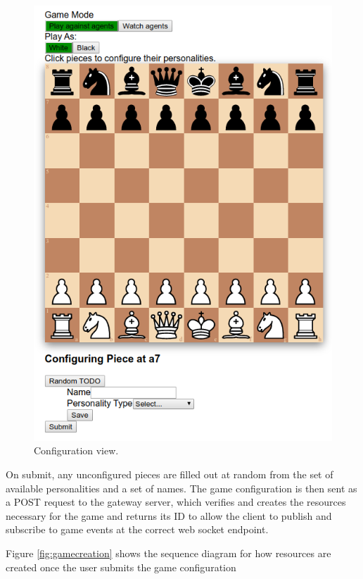 \documentclass[conference]{IEEEtran}
\begin{document}
\begin{figure}[!h]
	\centering
	\includegraphics[width=\linewidth]{images/configview}
	\caption{Configuration view.}
	\label{fig:configview}
\end{figure}

On submit, any unconfigured pieces are filled out at random from the set of available personalities and a set of names. The game configuration is then sent as a POST request to the gateway server, which verifies and creates the resources necessary for the game and returns its ID to allow the client to publish and subscribe to game events at the correct web socket endpoint.

Figure \ref{fig:gamecreation} shows the sequence diagram for how resources are created once the user submits the game configuration
\end{document}
